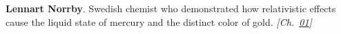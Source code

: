 \textbf{Lennart Norrby}. Swedish chemist who demonstrated how relativistic effects cause the liquid state of mercury and the distinct color of gold. \emph{[Ch.~\hyperref[ch:goldrelativity]{01}]}

